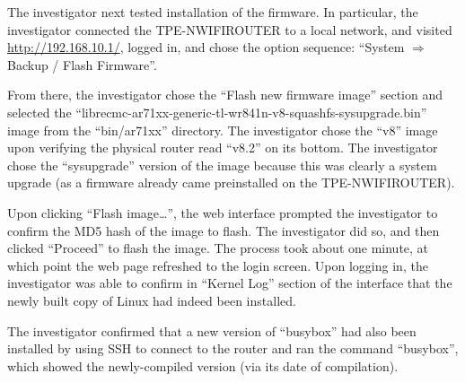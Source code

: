 The investigator next tested installation of the firmware.  In particular,
the investigator connected the TPE-NWIFIROUTER to a local network, and
visited \url{http://192.168.10.1/}, logged in, and chose the option sequence:
``System $\Rightarrow$ Backup / Flash Firmware''.

From there, the investigator chose the ``Flash new firmware image'' section
and selected the
``librecmc-ar71xx-generic-tl-wr841n-v8-squashfs-sysupgrade.bin'' image from
the ``bin/ar71xx'' directory.  The investigator chose the ``v8'' image upon
verifying the physical router read ``v8.2'' on its bottom.  The investigator
chose the ``sysupgrade'' version of the image because this was clearly a
system upgrade (as a firmware already came preinstalled on the
TPE-NWIFIROUTER).

Upon clicking ``Flash image\ldots'', the web interface prompted the
investigator to confirm the MD5 hash of the image to flash.  The investigator
did so, and then clicked ``Proceed'' to flash the image.  The process took
about one minute, at which point the web page refreshed to the login screen.
Upon logging in, the investigator was able to confirm in ``Kernel Log''
section of the interface that the newly built copy of Linux had indeed been
installed.

The investigator confirmed that a new version of ``busybox'' had also been
installed by using SSH to connect to the router and ran the command
``busybox'', which showed the newly-compiled version (via its date of
compilation).






